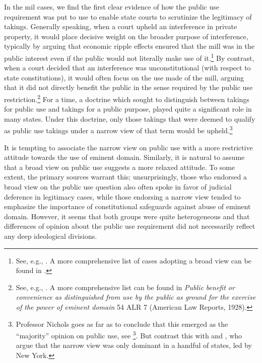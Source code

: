 In the mil cases, we find the first clear evidence of how the public use requirement was put to use to enable state courts to scrutinize the legitimacy of takings. Generally speaking, when a court upheld an interference in private property, it would place decisive weight on the broader purpose of interference, typically by arguing that economic ripple effects ensured that the mill was in the public interest even if the public would not literally make use of it.\footnote{See, e.g., \cite{hazen53,scudder32,boston32}. A more comprehensive list of cases adopting a broad view can be found in \cite[617]{nichols40}.} By contrast, when a court decided that an interference was unconstitutional (with respect to state constitutions), it would often focus on the use made of the mill, arguing that it did not directly benefit the public in the sense required by the public use restriction.\footnote{See, e.g., \cite{sadler59,ryerson77,gaylord03,minn06}. A more comprehensive list can be found in {\it Public benefit or convenience as distinguished from use by the public as ground for the exercise of the power of eminent domain} 54 ALR 7 (American Law Reports, 1928).} For a time, a doctrine which sought to distinguish between takings for public use and takings for a public purpose, played quite a significant role in many states. Under this doctrine, only those takings that were deemed to qualify as public use takings under a narrow view of that term would be upheld.\footnote{Professor Nichols goes as far as to conclude that this emerged as the ``majority'' opinion on public use, see \footcite[617-618]{nichols40}. But contrast this with \cite{berger78} and \cite[24]{meidinger80}, who argue that the narrow view was only dominant in a handful of states, led by New York.}


It is tempting to associate the narrow view on public use with a more restrictive attitude towards the use of eminent domain. Similarly, it is natural to assume that a broad view on public use suggests a more relaxed attitude. To some extent, the primary sources warrant this; unsurprisingly, those who endorsed a broad view on the public use question also often spoke in favor of judicial deference in legitimacy cases, while those endorsing a narrow view tended to emphasize the importance of constitutional safeguards against abuse of eminent domain. However, it seems that both groups were quite heterogeneous and that differences of opinion about the public use requirement did not necessarily reflect any deep ideological divisions.

